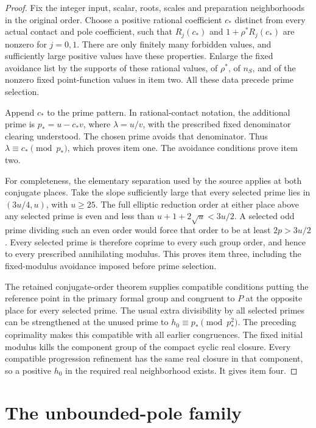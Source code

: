 \documentclass[11pt,a4paper]{article}
\begin{document}
\begin{proof}
Fix the integer input, scalar, roots, scales and preparation
neighborhoods in the original order. Choose a positive rational
coefficient \(c_*\) distinct from every actual contact and pole
coefficient, such that \(R_j(c_*)\) and
\(1+\rho^*R_j(c_*)\) are nonzero for \(j=0,1\).
There are only finitely many forbidden values, and sufficiently large
positive values have these properties. Enlarge the fixed avoidance
list by the supports of these rational values, of \(\rho^*\), of
\(n_S\), and of the nonzero fixed point-function values in item two.
All these data precede prime selection.

Append \(c_*\) to the prime pattern. In rational-contact notation,
the additional prime is \(p_*=u-c_*v\), where \(\lambda=u/v\),
with the prescribed fixed denominator clearing understood. The chosen
prime avoids that denominator. Thus \(\lambda\equiv c_*\pmod{p_*}\),
which proves item one. The avoidance conditions prove item two.

For completeness, the elementary separation used by the source applies
at both conjugate places. Take the slope sufficiently large that every
selected prime lies in \((3u/4,u)\), with \(u\ge25\).
The full elliptic reduction order at either place above any selected
prime is even and less than
\(u+1+2\sqrt u<3u/2\). A selected odd prime dividing such an even
order would force that order to be at least \(2p>3u/2\).
Every selected prime is therefore coprime to every such group order,
and hence to every prescribed annihilating modulus. This proves
item three, including the fixed-modulus avoidance imposed before
prime selection.

The retained conjugate-order theorem supplies compatible conditions
putting the reference point in the primary formal group and congruent
to \(P\) at the opposite place for every selected prime.
The usual extra divisibility by all selected primes can be strengthened
at the unused prime to
\(h_0\equiv p_*\pmod{p_*^2}\). The preceding coprimality makes
this compatible with all earlier congruences. The fixed initial
modulus kills the component group of the compact cyclic real closure.
Every compatible progression refinement has the same real closure in
that component, so a positive \(h_0\) in the required real neighborhood
exists. It gives item four.
\end{proof}

\section{The unbounded-pole family}
\end{document}

